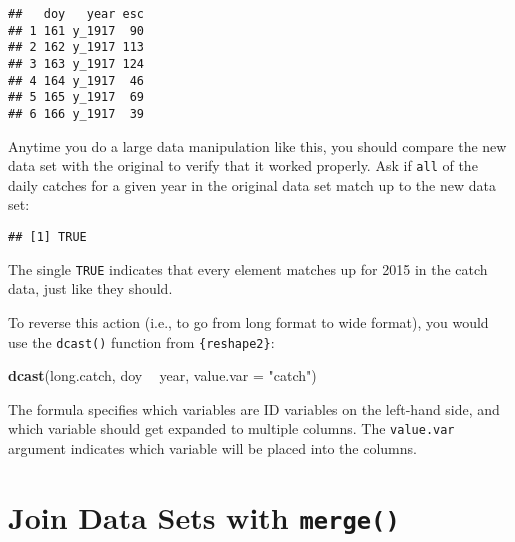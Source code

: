 \documentclass[]{book}
\newenvironment{Shaded}{\begin{snugshade}}{\end{snugshade}}
\newcommand{\KeywordTok}[1]{\textcolor[rgb]{0.13,0.29,0.53}{\textbf{#1}}}
\newcommand{\DataTypeTok}[1]{\textcolor[rgb]{0.13,0.29,0.53}{#1}}
\newcommand{\DecValTok}[1]{\textcolor[rgb]{0.00,0.00,0.81}{#1}}
\newcommand{\StringTok}[1]{\textcolor[rgb]{0.31,0.60,0.02}{#1}}
\newcommand{\OperatorTok}[1]{\textcolor[rgb]{0.81,0.36,0.00}{\textbf{#1}}}
\newcommand{\NormalTok}[1]{#1}
\theoremstyle{definition}
\theoremstyle{definition}
\theoremstyle{definition}
\theoremstyle{remark}
\begin{document}
\begin{verbatim}
##   doy   year esc
## 1 161 y_1917  90
## 2 162 y_1917 113
## 3 163 y_1917 124
## 4 164 y_1917  46
## 5 165 y_1917  69
## 6 166 y_1917  39
\end{verbatim}

Anytime you do a large data manipulation like this, you should compare
the new data set with the original to verify that it worked properly.
Ask if \texttt{all} of the daily catches for a given year in the
original data set match up to the new data set:

\begin{Shaded}
\end{Shaded}

\begin{verbatim}
## [1] TRUE
\end{verbatim}

The single \texttt{TRUE} indicates that every element matches up for
2015 in the catch data, just like they should.

To reverse this action (i.e., to go from long format to wide format),
you would use the \texttt{dcast()} function from \texttt{\{reshape2\}}:

\begin{Shaded}
\begin{Highlighting}[]
\KeywordTok{dcast}\NormalTok{(long.catch, doy }\OperatorTok{~}\StringTok{ }\NormalTok{year, }\DataTypeTok{value.var =} \StringTok{"catch"}\NormalTok{)}
\end{Highlighting}
\end{Shaded}

The formula specifies which variables are ID variables on the left-hand
side, and which variable should get expanded to multiple columns. The
\texttt{value.var} argument indicates which variable will be placed into
the columns.

\section{\texorpdfstring{Join Data Sets with
\texttt{merge()}}{Join Data Sets with merge()}}\label{join-data-sets-with-merge}
\end{document}
